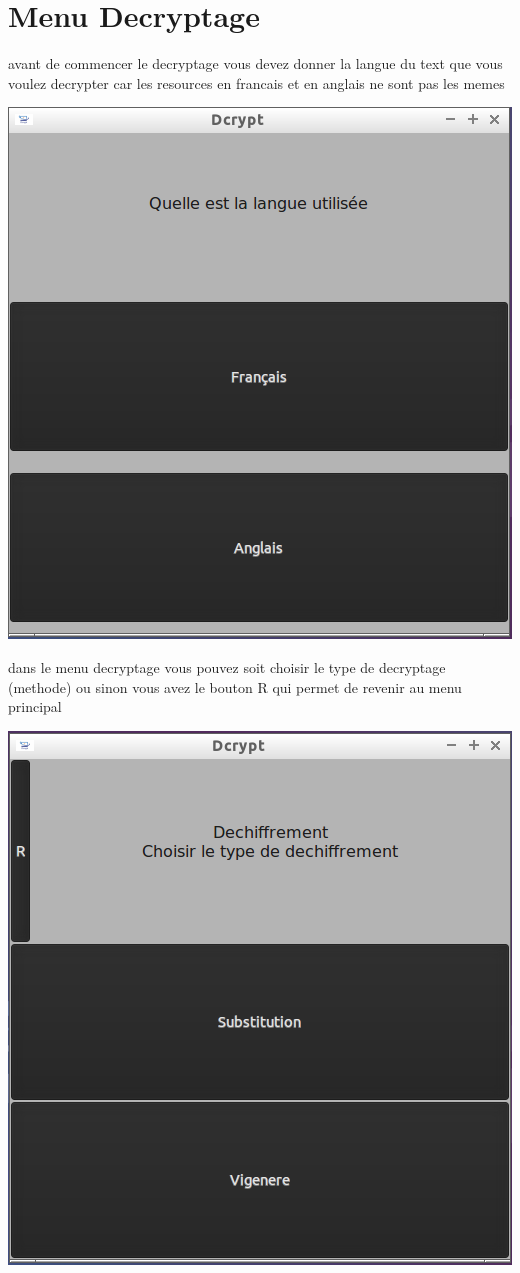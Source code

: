 \documentclass[a4]{article}
\begin{document}
	\section{Menu Decryptage}
		avant de commencer le decryptage vous devez donner la langue du text que vous voulez decrypter car 
		les resources en francais et en anglais ne sont pas les memes
		\begin{center}\includegraphics[scale=0.4]{8.png}\end{center}
		dans le menu decryptage vous pouvez soit choisir le type de decryptage (methode) ou 
		sinon vous avez le bouton R qui permet de revenir au menu principal
		\begin{center}\includegraphics[scale=0.4]{9.png}\end{center}
\end{document}
